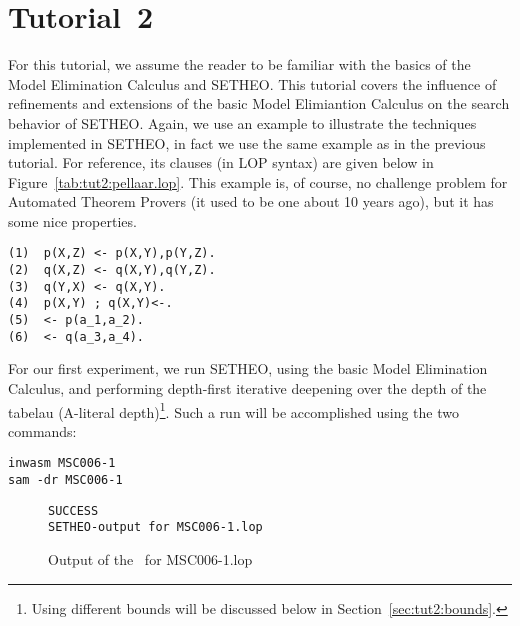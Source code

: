 %

\section{Tutorial~2}

For this tutorial, we assume the reader to be familiar with the
basics of the Model Elimination Calculus and SETHEO. This 
tutorial covers the influence of refinements and extensions
of the basic Model Elimiantion Calculus on the search behavior of SETHEO.
Again, we use an example to illustrate the techniques implemented in
SETHEO, in fact we use the same example as in the previous tutorial.
For reference, its clauses (in LOP syntax) are given below in 
Figure~\ref{tab:tut2:pellaar.lop}. This example is, of course, no
challenge problem for Automated Theorem Provers
(it used to be one about 10 years ago), but it has some nice 
properties.


\begin{table}[htb]
\begin{center}
\begin{verbatim}
(1)  p(X,Z) <- p(X,Y),p(Y,Z).
(2)  q(X,Z) <- q(X,Y),q(Y,Z).
(3)  q(Y,X) <- q(X,Y).
(4)  p(X,Y) ; q(X,Y)<-.
(5)  <- p(a_1,a_2).
(6)  <- q(a_3,a_4).
\end{verbatim}
\end{center}
\caption{LOP clauses of the Example (file: MSC006-1.lop)}
\label{tab:tut2:pellaar.lop}
\end{table}

For our first experiment, we run SETHEO, using the basic Model Elimination
Calculus, and performing depth-first iterative deepening over the
depth of the tabelau (A-literal depth)\footnote{
	Using different bounds
	will be discussed below in Section~\ref{sec:tut2:bounds}.}.
Such a run will be accomplished using the two commands:

\begin{center}
\begin{verbatim}
inwasm MSC006-1
sam -dr MSC006-1
\end{verbatim}
\end{center}

\begin{figure}[htb]
\begin{center}
\begin{verbatim}
SUCCESS
SETHEO-output for MSC006-1.lop
\end{verbatim}
\end{center}
\caption{Output of the \SAM\ for MSC006-1.lop}
\label{fig:tut2:pellaar.pure.log}
\end{figure}

